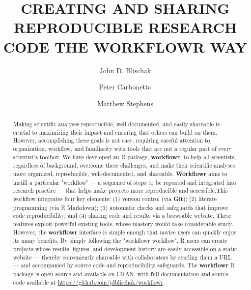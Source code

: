 \documentclass[9pt,a4paper]{extarticle}
\begin{document}
\pagestyle{front}

\title{CREATING AND SHARING REPRODUCIBLE RESEARCH CODE THE WORKFLOWR
WAY}

\author[1]{John D. Blischak}

\author[1,2]{Peter Carbonetto}

\author[1,3]{Matthew Stephens}




\maketitle

\thispagestyle{front}

\begin{abstract}


Making scientific analyses reproducible, well documented, and easily
shareable is crucial to maximizing their impact and ensuring that others
can build on them. However, accomplishing these goals is not easy,
requiring careful attention to organization, workflow, and familiarity
with tools that are not a regular part of every scientist's toolbox. We
have developed an R package, \textbf{workflowr}, to help all scientists,
regardless of background, overcome these challenges, and make their
scientific analyses more organized, reproducible, well-documented, and
shareable. \textbf{Workflowr} aims to instill a particular "workflow" --- a
sequence of steps to be repeated and integrated into research practice
--- that helps make projects more reproducible and accessible.This
workflow integrates four key elements: (1) version control (via \textbf{Git});
(2) literate programming (via R Markdown); (3) automatic checks and
safeguards that improve code reproducibility; and (4) sharing code and
results via a browsable website. These features exploit powerful
existing tools, whose mastery would take considerable study. However,
the \textbf{workflowr} interface is simple enough that novice users can quickly
enjoy its many benefits. By simply following the "workflowr workflow", R
users can create projects whose results, figures, and development
history are easily accessible on a static website --- thereby
conveniently shareable with collaborators by sending them a URL --- and
accompanied by source code and reproducibility safeguards. The \textbf{workflowr}
R package is open source and available on CRAN, with full documentation
and source code available at
\url{https://github.com/jdblischak/workflowr}.

\end{abstract}
\end{document}
